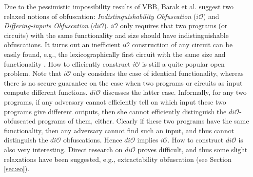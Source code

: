 \documentclass[12pt]{article}
\newcommand{\io}{i\mathcal{O}}
\newcommand{\dio}{di\mathcal{O}}
\theoremstyle{definition}
\begin{document}
Due to the pessimistic impossibility results of VBB, Barak et al. \cite{barak2001possibility} suggest two relaxed notions of obfuscation: \emph{Indistinguishability Obfuscation} ($\io$) and \emph{Differing-inputs Obfuscation} ($\dio$). $\io$ only requires that two programs (or circuits) with the same functionality and size should have indistinguishable obfuscations. It turns out an inefficient $\io$ construction of any circuit can be easily found, e.g., the lexicographically first circuit with the same size and functionality \cite{barak2001possibility}. How to efficiently construct $\io$ is still a quite popular open problem. Note that $\io$ only considers the case of identical functionality, whereas there is no secure guarantee on the case when two programs or circuits as input compute different functions. $\dio$ discusses the latter case. Informally, for any two programs, if any adversary cannot efficiently tell on which input these two programs give different outputs, then she cannot efficiently distinguish the $\dio$-obfuscated programs of them, either. Clearly if these two programs have the same functionality, then any adversary cannot find such an input, and thus cannot distinguish the $\dio$ obfuscations. Hence $\dio$ implies $\io$. How to construct $\dio$ is also very interesting. Direct research on $\dio$ proves difficult, and thus some slight relaxations have been suggested, e.g., extractability obfuscation \cite{boyle2014extractability} (see Section \ref{sec:eo}).
\end{document}
